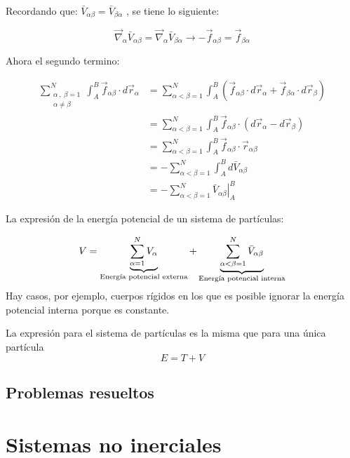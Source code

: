 \documentclass[/home/hernan/Documentos/Apuntes_mecanica_teorica/main.tex]{subfiles}
\begin{document}
	Recordando que: $\bar{V}_{\alpha \beta} = \bar{V}_{\beta \alpha}$ , se tiene lo siguiente:

	\begin{equation*}
		\vec{\nabla}_{\alpha} \bar{V}_{\alpha \beta} = \vec{\nabla}_{\alpha} \bar{V}_{\beta \alpha} \rightarrow -\vec{f}_{\alpha \beta} = \vec{f}_{\beta \alpha}
	\end{equation*}

	Ahora el segundo termino:

	\begin{align*}
		\sum_{\left . \begin{matrix} \alpha \: , \: \beta = 1\\ \alpha \neq \beta \end{matrix} \right .}^{N} \int_{A}^{B} \vec{f}_{\alpha \beta} \cdot d\vec{r}_{\alpha} &= \sum_{ \alpha < \beta = 1}^{N} \int_{A}^{B} \left(\vec{f}_{\alpha \beta} \cdot d\vec{r}_{\alpha} +  \vec{f}_{\beta \alpha} \cdot d\vec{r}_{\beta} \right) \\ 
		& = \sum_{ \alpha < \beta = 1}^{N} \int_{A}^{B} \vec{f}_{\alpha \beta} \cdot \left( d\vec{r}_{\alpha} -  d\vec{r}_{\beta} \right) \\
		& =  \sum_{ \alpha < \beta = 1}^{N} \int_{A}^{B} \vec{f}_{\alpha \beta} \cdot \vec{r}_{\alpha \beta} \\ 
		& = - \sum_{ \alpha < \beta = 1}^{N} \int_{A}^{B} d\bar{V}_{\alpha \beta} \\ 
		& = - \sum_{ \alpha < \beta = 1}^{N} \left . \bar{V}_{\alpha \beta} \right|_{A}^{B}
	\end{align*}

	\begin{definition}
		La expresión de la energía potencial de un sistema de partículas:

		\begin{equation}
			V = \underbrace{\sum_{\alpha = 1}^{N} V_{\alpha}}_{\textup{Energía potencial externa}} + \underbrace{\sum_{ \alpha < \beta = 1}^{N} \bar{V}_{\alpha \beta}}_{\textup{Energía potencial interna}}
			\label{eq: potential}
		\end{equation}
		Hay casos, por ejemplo, cuerpos rígidos en los que es posible ignorar la energía potencial interna porque es constante.
	\end{definition}

	\begin{definition}
		La expresión para el sistema de partículas es la misma que para una única partícula 
		\begin{equation*}
			E = T + V
		\end{equation*}
	\end{definition}

	\subsection{Problemas resueltos}


	
	
	\section{Sistemas no inerciales}
	\label{sec: noinerciales}
\end{document}
